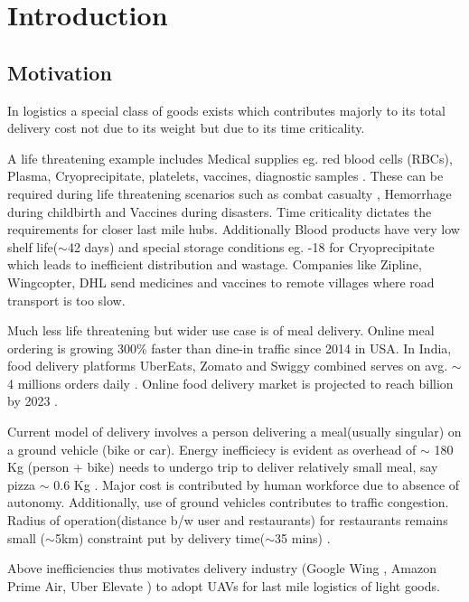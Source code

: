 \section{Introduction}
\subsection{Motivation}
In logistics a special class of goods exists which contributes majorly to its total delivery cost not due to its weight but due to its time criticality.

A life threatening example includes 
Medical supplies eg.  red blood cells (RBCs), Plasma, Cryoprecipitate, platelets, vaccines, diagnostic samples \cite{guinea}. These can be required during life threatening scenarios such as  combat casualty \cite{gilmore2019autonomous}, Hemorrhage during childbirth \cite{zipline_mit}  and Vaccines during disasters. Time criticality dictates the requirements for closer last mile hubs. Additionally Blood products have very low shelf life($\sim$42 days) \cite{blood_storage}  and special storage conditions eg. -18 \textcelsius{} for Cryoprecipitate \cite{blood_storage} which leads to inefficient distribution and wastage. Companies like Zipline\cite{zipline_rwanda}, Wingcopter\cite{wingcopter_vanuatu}, DHL\cite{dhl_tanzania} send medicines and vaccines to remote villages where road transport is too slow.

Much less life threatening but wider use case is of meal delivery. Online meal ordering is growing 300\% faster than dine-in traffic \cite{meal_300} since 2014 in USA. In India, food delivery platforms UberEats, Zomato and Swiggy combined serves on avg. $\sim$4 millions orders daily \cite{india_daily}. Online food delivery market is projected to reach  billion by 2023 \cite{billion_2023}.

Current model of delivery involves a person delivering a meal(usually singular) on a ground vehicle (bike or car). Energy inefficiecy is evident as overhead of $\sim$ 180 Kg (person + bike) needs to undergo trip to deliver relatively small meal, say pizza $\sim$ 0.6 Kg \cite{dominos}. Major cost is contributed by human workforce due to absence of autonomy. Additionally, use of ground vehicles contributes to traffic congestion. Radius of operation(distance b/w user and restaurants) for restaurants remains small ($\sim$5km)  constraint put by delivery time($\sim$35 mins) \cite{swiggy_radius}.

Above inefficiencies thus motivates delivery industry (Google Wing \cite{google_wing_last_mile}, Amazon Prime Air\cite{prime_air}, Uber Elevate \cite{uber_eats_drone}) to adopt UAVs for last mile logistics of light goods.

